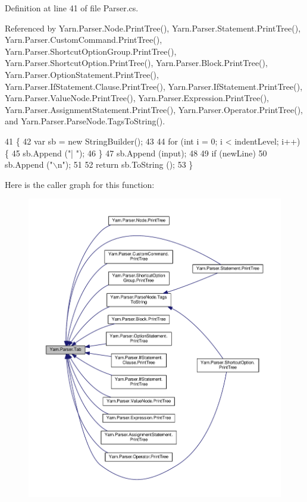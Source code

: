 Definition at line 41 of file Parser.\-cs.



Referenced by Yarn.\-Parser.\-Node.\-Print\-Tree(), Yarn.\-Parser.\-Statement.\-Print\-Tree(), Yarn.\-Parser.\-Custom\-Command.\-Print\-Tree(), Yarn.\-Parser.\-Shortcut\-Option\-Group.\-Print\-Tree(), Yarn.\-Parser.\-Shortcut\-Option.\-Print\-Tree(), Yarn.\-Parser.\-Block.\-Print\-Tree(), Yarn.\-Parser.\-Option\-Statement.\-Print\-Tree(), Yarn.\-Parser.\-If\-Statement.\-Clause.\-Print\-Tree(), Yarn.\-Parser.\-If\-Statement.\-Print\-Tree(), Yarn.\-Parser.\-Value\-Node.\-Print\-Tree(), Yarn.\-Parser.\-Expression.\-Print\-Tree(), Yarn.\-Parser.\-Assignment\-Statement.\-Print\-Tree(), Yarn.\-Parser.\-Operator.\-Print\-Tree(), and Yarn.\-Parser.\-Parse\-Node.\-Tags\-To\-String().


\begin{DoxyCode}
41                                                                                       \{
42             var sb = \textcolor{keyword}{new} StringBuilder();
43 
44             \textcolor{keywordflow}{for} (\textcolor{keywordtype}{int} i = 0; i < indentLevel; i++) \{
45                 sb.Append (\textcolor{stringliteral}{"| "});
46             \}
47             sb.Append (input);
48 
49             \textcolor{keywordflow}{if} (newLine)
50                 sb.Append (\textcolor{stringliteral}{"\(\backslash\)n"});
51 
52             \textcolor{keywordflow}{return} sb.ToString ();
53         \}
\end{DoxyCode}


Here is the caller graph for this function\-:
\nopagebreak
\begin{figure}[H]
\begin{center}
\leavevmode
\includegraphics[width=350pt]{a00149_aa8fa36b46de12a1c561d77b99c4b9ae3_icgraph}
\end{center}
\end{figure}




